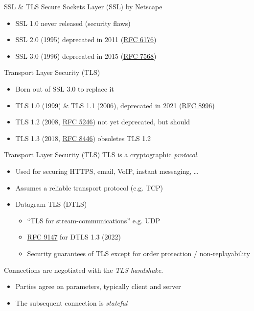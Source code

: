 \begin{frame}{SSL \& TLS}
  Secure Sockets Layer (SSL) by Netscape
  \begin{itemize}[<+(1)->]
    \item SSL 1.0 never released (security flaws)
    \item SSL 2.0 (1995) deprecated in 2011 (\href{https://datatracker.ietf.org/doc/html/rfc6176}{RFC 6176})
    \item SSL 3.0 (1996) deprecated in 2015 (\href{https://datatracker.ietf.org/doc/html/rfc7568}{RFC 7568}) 
  \end{itemize}

  \vspace*{1em}

  \pause
  Transport Layer Security (TLS)
  \begin{itemize}[<+(1)->]
    \item Born out of SSL 3.0 to replace it
    \item TLS 1.0 (1999) \& TLS 1.1 (2006), deprecated in 2021 (\href{https://datatracker.ietf.org/doc/html/rfc8996}{RFC 8996})
    \item TLS 1.2 (2008, \href{https://datatracker.ietf.org/doc/html/rfc5246}{RFC 5246}) not yet deprecated, but should
    \item TLS 1.3 (2018, \href{https://datatracker.ietf.org/doc/html/rfc8446}{RFC 8446}) obsoletes TLS 1.2
  \end{itemize}
\end{frame}

\begin{frame}{Transport Layer Security (TLS)}
  TLS is a cryptographic \emph{protocol}.
  \begin{itemize}[<+(1)->]
    \item Used for securing HTTPS, email, VoIP, instant messaging, \dots
    \item Assumes a reliable transport protocol (e.g. TCP)
    \item Datagram TLS (DTLS)
    \begin{itemize}
      \item \enquote{TLS for stream-communications} e.g. UDP
      \item \href{https://datatracker.ietf.org/doc/html/rfc9147}{RFC 9147} for DTLS 1.3 (2022)
      \item Security guarantees of TLS except for order protection / non-replayability
    \end{itemize}
  \end{itemize}

  \vspace*{1em}

  \pause
  Connections are negotiated with the \emph{TLS handshake}.
  \begin{itemize}[<+(1)->]
    \item Parties agree on parameters, typically client and server
    \item The subsequent connection is \emph{stateful}
  \end{itemize}
\end{frame}

